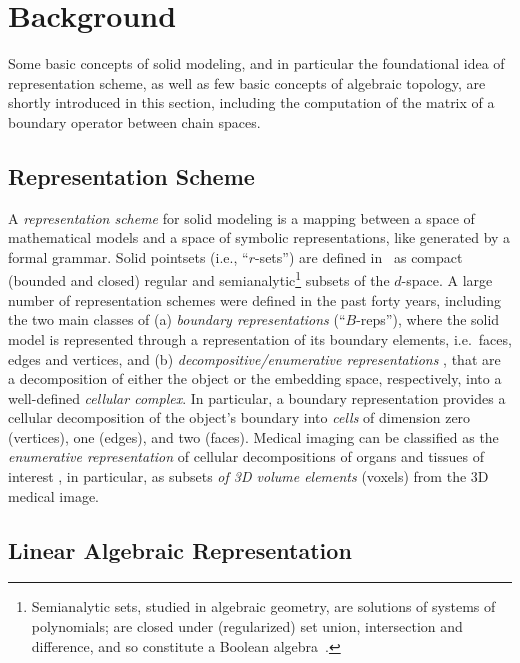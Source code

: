 
\section{Background}\label{sec:background}

Some basic concepts of solid modeling, and in particular the foundational idea of representation scheme, as well as few basic concepts of algebraic topology, are shortly introduced in this section, including the computation of the matrix of a boundary operator between chain spaces.

\subsection{Representation Scheme}\label{sec:schemes}

A \emph{representation scheme} for solid modeling is a mapping between a space of mathematical models and a space of symbolic representations, like generated by a formal grammar.
Solid pointsets (i.e., ``$r$-sets'') are defined in~\cite{Requicha:1980:RRS:356827.356833} as compact (bounded and closed) regular and semianalytic\footnote{Semianalytic sets, studied in algebraic geometry, are solutions of systems of polynomials; are closed under (regularized) set union, intersection and difference, and so constitute a Boolean algebra~\cite{2019arXiv191011848P}.} subsets of the $d$-space. A large number of representation schemes were defined in the past forty years, including the two main classes of (a) \emph{boundary representations} (``$B$-reps''), where the solid model is represented through a representation of its boundary elements, i.e.~faces, edges and vertices, and (b) \emph{decompositive/enumerative representations} \cite{Requicha:1980:RRS:356827.356833}, that are a decomposition of either the object or the embedding space, respectively, into a well-defined \emph{cellular complex}. In particular, a boundary representation provides a cellular decomposition of the object's boundary into \emph{cells} of dimension zero (vertices), one (edges), and two (faces). Medical imaging can be classified as the \emph{enumerative representation} of cellular decompositions of organs and tissues of interest \cite{Paoluzzi2016}, in particular, as subsets \emph{of 3D volume elements} (voxels) from the 3D medical image. 


\subsection{Linear Algebraic Representation}\label{sec:lar}


